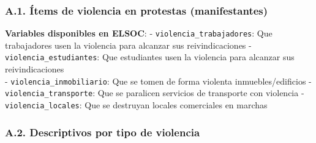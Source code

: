 \documentclass[
  12pt,
]{article}
\begin{document}
\subsubsection{A.1. Ítems de violencia en protestas
(manifestantes)}\label{a.1.-uxedtems-de-violencia-en-protestas-manifestantes}

\textbf{Variables disponibles en ELSOC}: -
\texttt{violencia\_trabajadores}: Que trabajadores usen la violencia
para alcanzar sus reivindicaciones - \texttt{violencia\_estudiantes}:
Que estudiantes usen la violencia para alcanzar sus reivindicaciones\\
- \texttt{violencia\_inmobiliario}: Que se tomen de forma violenta
inmuebles/edificios - \texttt{violencia\_transporte}: Que se paralicen
servicios de transporte con violencia - \texttt{violencia\_locales}: Que
se destruyan locales comerciales en marchas

\subsubsection{A.2. Descriptivos por tipo de
violencia}\label{a.2.-descriptivos-por-tipo-de-violencia}
\end{document}
